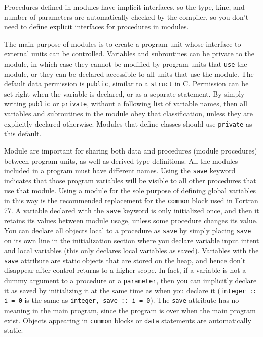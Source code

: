 \documentclass[10pt]{article}
\begin{document}
Procedures defined in modules have implicit interfaces, so the type, kine, and number of parameters are automatically checked by the compiler, so you don't need to define explicit interfaces for procedures in modules. 

The main purpose of modules is to create a program unit whose interface to external units can be controlled. Variables and subroutines can be private to the module, in which case they cannot be modified by program units that {\tt use} the module, or they can be declared accessible to all units that use the module. The default data permission is {\tt public}, similar to a {\tt struct} in C. Permission can be set right when the variable is declared, or as a separate statement. By simply writing {\tt public} or {\tt private}, without a following list of variable names, then all variables and subroutines in the module obey that classification, unless they are explicitly declared otherwise. Modules that define classes should use {\tt private} as this default.

Module are important for sharing both data and procedures (module procedures) between program units, as well as derived type definitions. All the modules included in a program must have different names. Using the {\tt save} keyword indicates that those program variables will be visible to all other procedures that use that module. Using a module for the sole purpose of defining global variables in this way is the recommended replacement for the {\tt common} block used in Fortran 77. A variable declared with the {\tt save} keyword is only initialized once, and then it retains its values between module usage, unless some procedure changes its value. You can declare all objects local to a procedure as {\tt save} by simply placing {\tt save} on its own line in the initialization section where you declare variable input intent and local variables (this only declares local variables as saved). Variables with the {\tt save} attribute are static objects that are stored on the heap, and hence don't disappear after control returns to a higher scope. In fact, if a variable is not a dummy argument to a procedure or a {\tt parameter}, then you can implicitly declare it as saved by initializing it at the same time as when you declare it ({\tt integer :: i = 0} is the same as {\tt integer, save :: i = 0}). The {\tt save} attribute has no meaning in the main program, since the program is over when the main program exist. Objects appearing in {\tt common} blocks or {\tt data} statements are automatically static.
\end{document}
